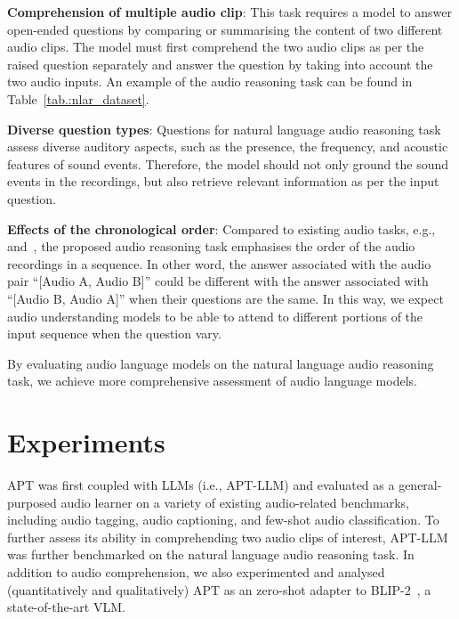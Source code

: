 \textbf{Comprehension of multiple audio clip}: This task requires a model to answer open-ended questions by comparing or summarising the content of two different audio clips. The model must first comprehend the two audio clips as per the raised question separately and answer the question by taking into account the two audio inputs. An example of the audio reasoning task can be found in Table~\ref{tab.:nlar_dataset}. 

\textbf{Diverse question types}: Questions for natural language audio reasoning task assess diverse auditory aspects, such as the presence, the frequency, and acoustic features of sound events. Therefore, the model should not only ground the sound events in the recordings, but also retrieve relevant information as per the input question. 

\textbf{Effects of the chronological order}: Compared to existing audio tasks, e.g.,~\citep{li_blip-2_2023} and~\citep{gong_listen_2023}, the proposed audio reasoning task emphasises the order of the audio recordings in a sequence. In other word, the answer associated with the audio pair ``[Audio A, Audio B]'' could be different with the answer associated with  ``[Audio B, Audio A]'' when their questions are the same. In this way, we expect audio understanding models to be able to attend to different portions of the input sequence when the question vary. 

By evaluating audio language models on the natural language audio reasoning task, we achieve more comprehensive assessment of audio language models.

\section{Experiments} \label{sec:experiments}
APT was first coupled with LLMs (i.e., APT-LLM) and evaluated as a general-purposed audio learner on a variety of existing audio-related benchmarks, including audio tagging, audio captioning, and few-shot audio classification. To further assess its ability in comprehending two audio clips of interest, APT-LLM was further benchmarked on the natural language audio reasoning task. In addition to audio comprehension, we also experimented and analysed (quantitatively and qualitatively) APT as an zero-shot adapter to BLIP-2~\citep{li_blip-2_2023,dai_instructblip_2023}, a state-of-the-art VLM.

